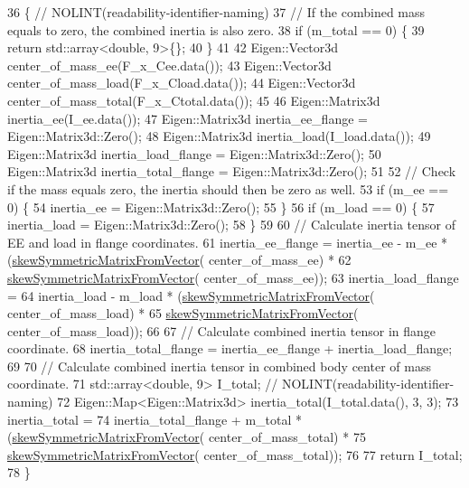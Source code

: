 \begin{DoxyCode}
36                                            \{  \textcolor{comment}{// NOLINT(readability-identifier-naming)}
37   \textcolor{comment}{// If the combined mass equals to zero, the combined inertia is also zero.}
38   \textcolor{keywordflow}{if} (m\_total == 0) \{
39     \textcolor{keywordflow}{return} std::array<double, 9>\{\};
40   \}
41 
42   Eigen::Vector3d center\_of\_mass\_ee(F\_x\_Cee.data());
43   Eigen::Vector3d center\_of\_mass\_load(F\_x\_Cload.data());
44   Eigen::Vector3d center\_of\_mass\_total(F\_x\_Ctotal.data());
45 
46   Eigen::Matrix3d inertia\_ee(I\_ee.data());
47   Eigen::Matrix3d inertia\_ee\_flange = Eigen::Matrix3d::Zero();
48   Eigen::Matrix3d inertia\_load(I\_load.data());
49   Eigen::Matrix3d inertia\_load\_flange = Eigen::Matrix3d::Zero();
50   Eigen::Matrix3d inertia\_total\_flange = Eigen::Matrix3d::Zero();
51 
52   \textcolor{comment}{// Check if the mass equals zero, the inertia should then be zero as well.}
53   \textcolor{keywordflow}{if} (m\_ee == 0) \{
54     inertia\_ee = Eigen::Matrix3d::Zero();
55   \}
56   \textcolor{keywordflow}{if} (m\_load == 0) \{
57     inertia\_load = Eigen::Matrix3d::Zero();
58   \}
59 
60   \textcolor{comment}{// Calculate inertia tensor of EE and load in flange coordinates.}
61   inertia\_ee\_flange = inertia\_ee - m\_ee * (\hyperlink{namespacefranka_a503ad33c66091a201a92c1262778d16f}{skewSymmetricMatrixFromVector}(
      center\_of\_mass\_ee) *
62                                            \hyperlink{namespacefranka_a503ad33c66091a201a92c1262778d16f}{skewSymmetricMatrixFromVector}(
      center\_of\_mass\_ee));
63   inertia\_load\_flange =
64       inertia\_load - m\_load * (\hyperlink{namespacefranka_a503ad33c66091a201a92c1262778d16f}{skewSymmetricMatrixFromVector}(
      center\_of\_mass\_load) *
65                                \hyperlink{namespacefranka_a503ad33c66091a201a92c1262778d16f}{skewSymmetricMatrixFromVector}(
      center\_of\_mass\_load));
66 
67   \textcolor{comment}{// Calculate combined inertia tensor in flange coordinate.}
68   inertia\_total\_flange = inertia\_ee\_flange + inertia\_load\_flange;
69 
70   \textcolor{comment}{// Calculate combined inertia tensor in combined body center of mass coordinate.}
71   std::array<double, 9> I\_total;  \textcolor{comment}{// NOLINT(readability-identifier-naming)}
72   Eigen::Map<Eigen::Matrix3d> inertia\_total(I\_total.data(), 3, 3);
73   inertia\_total =
74       inertia\_total\_flange + m\_total * (\hyperlink{namespacefranka_a503ad33c66091a201a92c1262778d16f}{skewSymmetricMatrixFromVector}(
      center\_of\_mass\_total) *
75                                         \hyperlink{namespacefranka_a503ad33c66091a201a92c1262778d16f}{skewSymmetricMatrixFromVector}(
      center\_of\_mass\_total));
76 
77   \textcolor{keywordflow}{return} I\_total;
78 \}
\end{DoxyCode}
